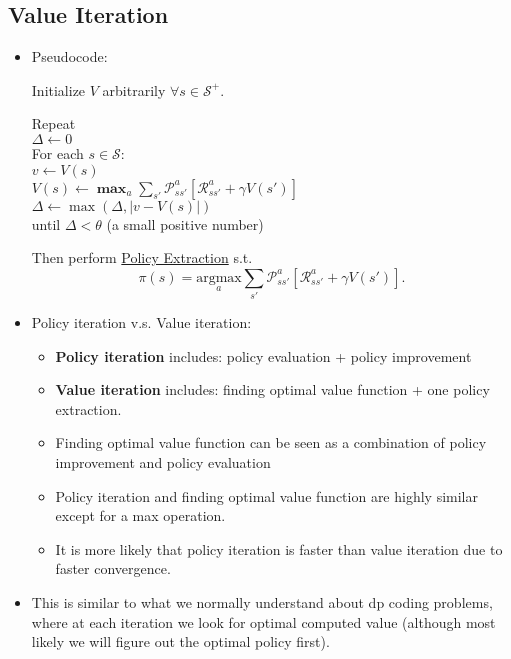 \documentclass[twocolumn,landscape,10pt]{article}
\theoremstyle{definition}
\begin{document}
\subsection{Value Iteration}

\begin{itemize}
    \item Pseudocode:

        Initialize $V$ arbitrarily $\forall s\in\mathcal{S}^+$.

        Repeat\\
        \hspace*{2ex}$\Delta\leftarrow 0$\\
        \hspace*{2ex}For each $s\in\mathcal{S}$:\\
        \hspace*{4ex}$v\leftarrow V(s)$\\
        \hspace*{4ex}$V(s)\leftarrow\pmb{\max}_a\sum_{s'}\mathcal{P}_{ss'}^a\left[\mathcal{R}_{ss'}^a+\gamma
        V(s')\right]$\\
        \hspace*{4ex}$\Delta\leftarrow\max{(\Delta,|v-V(s)|)}$\\
        until $\Delta<\theta$ (a small positive number)

        Then perform \underline{Policy Extraction} s.t.
        \[
            \pi(s)=\underset{a}{\text{argmax}}\sum_{s'}\mathcal{P}_{ss'}^a\left[\mathcal{R}_{ss'}^a+\gamma
            V(s')\right].
        \]
    \item Policy iteration v.s. Value iteration:
        \begin{itemize}
            \item \textbf{Policy iteration} includes: policy evaluation + policy
                improvement
            \item \textbf{Value iteration} includes: finding optimal value
                function + one policy extraction.
            \item Finding optimal value function can be seen as a combination of
                policy improvement and policy evaluation
            \item Policy iteration and finding optimal value function are highly
                similar except for a max operation.
            \item It is more likely that policy iteration is faster than value
                iteration due to faster convergence.
        \end{itemize}
    \item This is similar to what we normally understand about dp coding
        problems, where at each iteration we look for optimal computed value
        (although most likely we will figure out the optimal policy first).
\end{itemize}
\end{document}
